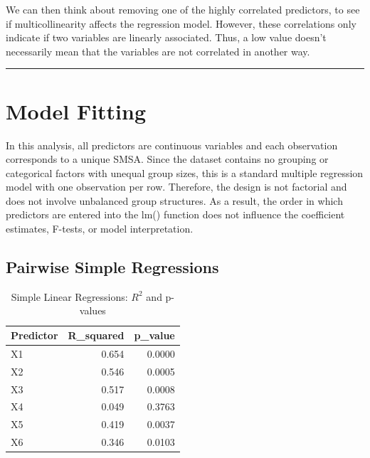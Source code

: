 \documentclass[
  11pt,
]{article}
\begin{document}
We can then think about removing one of the highly correlated
predictors, to see if multicollinearity affects the regression model.
However, these correlations only indicate if two variables are linearly
associated. Thus, a low value doesn't necessarily mean that the
variables are not correlated in another way.

\begin{center}\rule{0.5\linewidth}{0.5pt}\end{center}

\section{Model Fitting}\label{model-fitting}

In this analysis, all predictors are continuous variables and each
observation corresponds to a unique SMSA. Since the dataset contains no
grouping or categorical factors with unequal group sizes, this is a
standard multiple regression model with one observation per row.
Therefore, the design is not factorial and does not involve unbalanced
group structures. As a result, the order in which predictors are entered
into the lm() function does not influence the coefficient estimates,
F-tests, or model interpretation.

\subsection{Pairwise Simple
Regressions}\label{pairwise-simple-regressions}

\begingroup\fontsize{8}{10}\selectfont

\begin{longtable}[t]{lrr}
\caption{\label{tab:unnamed-chunk-8}Simple Linear Regressions: $R^2$ and p-values}\\
\toprule
Predictor & R\_squared & p\_value\\
\midrule
X1 & 0.654 & 0.0000\\
X2 & 0.546 & 0.0005\\
X3 & 0.517 & 0.0008\\
X4 & 0.049 & 0.3763\\
X5 & 0.419 & 0.0037\\
\addlinespace
X6 & 0.346 & 0.0103\\
\bottomrule
\end{longtable}
\endgroup{}
\end{document}
